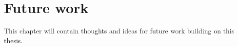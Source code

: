 \chapter{Future work}
This chapter will contain thoughts and ideas for future work building on this thesis.